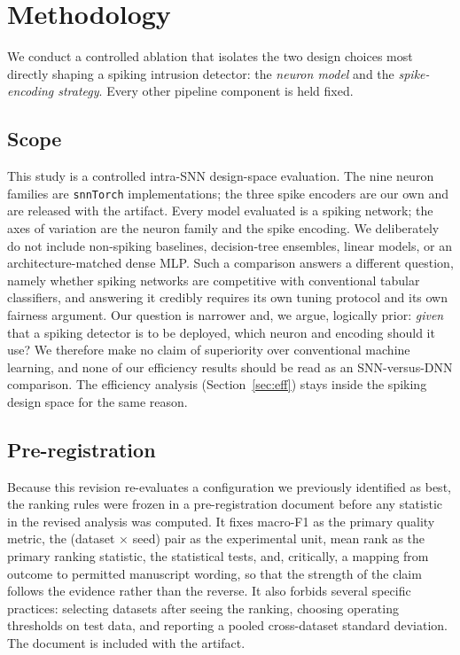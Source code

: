 %

\section{Methodology}

We conduct a controlled ablation that isolates the two design choices most
directly shaping a spiking intrusion detector: the \emph{neuron model} and the
\emph{spike-encoding strategy}. Every other pipeline component is held fixed.

\subsection{Scope}

This study is a controlled intra-SNN design-space evaluation. The nine neuron
families are \texttt{snnTorch} implementations; the three spike encoders are
our own and are released with the artifact. Every model evaluated is a spiking network; the
axes of variation are the neuron family and the spike encoding. We deliberately
do not include non-spiking baselines, decision-tree ensembles, linear models,
or an architecture-matched dense MLP. Such a comparison answers a different
question, namely whether spiking networks are competitive with conventional
tabular classifiers, and answering it credibly requires its own tuning protocol
and its own fairness argument. Our question is narrower and, we argue, logically
prior: \emph{given} that a spiking detector is to be deployed, which neuron and
encoding should it use? We therefore make no claim of superiority over
conventional machine learning, and none of our efficiency results should be read
as an SNN-versus-DNN comparison. The efficiency analysis (Section~\ref{sec:eff})
stays inside the spiking design space for the same reason.

\subsection{Pre-registration}

Because this revision re-evaluates a configuration we previously identified as
best, the ranking rules were frozen in a pre-registration document before any
statistic in the revised analysis was computed. It fixes macro-F1 as the primary
quality metric, the (dataset $\times$ seed) pair as the experimental unit, mean
rank as the primary ranking statistic, the statistical tests, and, critically, a mapping from outcome to permitted manuscript wording, so that the strength
of the claim follows the evidence rather than the reverse. It also forbids
several specific practices: selecting datasets after seeing the ranking,
choosing operating thresholds on test data, and reporting a pooled
cross-dataset standard deviation. The document is included with the artifact.


